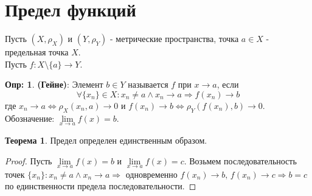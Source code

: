 \documentclass[12pt]{article}
\theoremstyle{definition}
\newtheorem{defn}{Опр:}
\newtheorem{theorem}{Теорема}
\begin{document}
\newpage
\section*{Предел функций}
Пусть $(X,\rho_X)$ и $(Y,\rho_Y)$ - метрические пространства, точка $a \in X$ - предельная точка $X$.\\
Пусть $f \colon X \setminus \{a\} \to Y$.
\begin{defn}
	\textbf{(Гейне)}: Элемент $b \in Y$ называется  $f$ при $x \to a$, если 
	$$
		\forall \{x_n\} \in X \colon x_n \neq a \wedge x_n \to a \Rightarrow f(x_n) \to b
	$$
	где $x_n \to a \Leftrightarrow \rho_X(x_n,a) \to 0$ и $f(x_n) \to b \Leftrightarrow \rho_Y(f(x_n),b) \to 0$. Обозначение: $\lim\limits_{x \to a}f(x) = b$.
\end{defn}
\begin{theorem}
	Предел определен единственным образом.
\end{theorem}
\begin{proof}
	Пусть $\lim\limits_{x \to a}f(x) = b$ и $\lim\limits_{x \to a}f(x) = c$. Возьмем последовательность точек $\{x_n\} \colon x_n \neq a \wedge x_n \to a \Rightarrow$ одновременно $f(x_n) \to b, \, f(x_n) \to c \Rightarrow b = c$  по единственности предела последовательности.
\end{proof}
\end{document}

